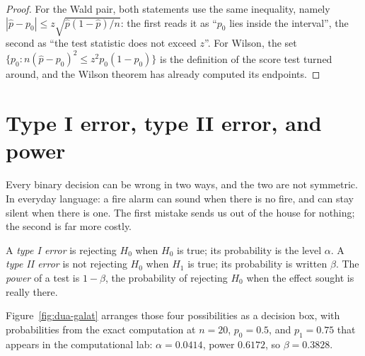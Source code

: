 \begin{proof}[Proof]
For the Wald pair, both statements use the same inequality, namely
$|\hat p-p_0|\le z\sqrt{\hat p(1-\hat p)/n}$: the first reads it as
``$p_0$ lies inside the interval'', the second as ``the test statistic does not exceed
$z$''. For Wilson, the set $\{p_0:n(\hat p-p_0)^2\le z^2p_0(1-p_0)\}$ is the
definition of the score test turned around, and the Wilson theorem has already computed its
endpoints.
\end{proof}

\section{Type I error, type II error, and power}

Every binary decision can be wrong in two ways, and the two are not symmetric.
In everyday language: a fire alarm can sound when there is no fire, and
can stay silent when there is one. The first mistake sends us out of the house for nothing;
the second is far more costly.

\begin{definisi}
A \emph{type I error} is rejecting $H_0$ when $H_0$ is true; its probability is the level
$\alpha$. A \emph{type II error} is not rejecting $H_0$ when $H_1$ is true;
its probability is written $\beta$. The \emph{power} of a test is $1-\beta$, the probability of
rejecting $H_0$ when the effect sought is really there.
\end{definisi}

Figure~\ref{fig:dua-galat} arranges those four possibilities as a decision box,
with probabilities from the exact computation at $n=20$, $p_0=0.5$, and $p_1=0.75$ that
appears in the computational lab: $\alpha=0.0414$, power $0.6172$, so $\beta=0.3828$.


